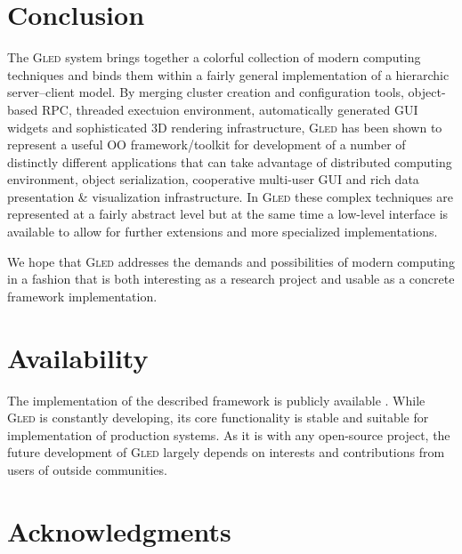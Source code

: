 \documentclass[final]{siamltex}
\def\gled{\textsc{Gled}\xspace}
\begin{document}
\section{Conclusion}

The \gled system brings together a colorful collection of modern
computing techniques and binds them within a fairly general
implementation of a hierarchic server--client model. By merging
cluster creation and configuration tools, object-based RPC, threaded
exectuion environment, automatically generated GUI widgets and
sophisticated 3D rendering infrastructure, \gled has been shown to
represent a useful OO framework/toolkit for development of a number of
distinctly different applications that can take advantage of
distributed computing environment, object serialization, cooperative
multi-user GUI and rich data presentation \& visualization
infrastructure. In \gled these complex techniques are represented at a
fairly abstract level but at the same time a low-level interface is
available to allow for further extensions and more specialized
implementations.

We hope that \gled addresses the demands and possibilities of modern
computing in a fashion that is both interesting as a research project
and usable as a concrete framework implementation.


\section*{Availability}

The implementation of the described framework is publicly available
\cite{gled.org}. While \gled is constantly developing, its core
functionality is stable and suitable for implementation of production
systems. As it is with any open-source project, the future
development of \gled largely depends on interests and contributions
from users of outside communities.

\section*{Acknowledgments}
\end{document}

